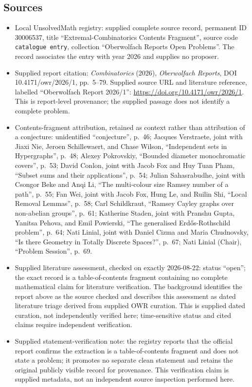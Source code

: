 \documentclass[11pt]{article}
\begin{document}
\subsection{Sources}
\begin{itemize}
\item Local UnsolvedMath registry: supplied complete source record, permanent ID 30006537, title ``Extremal-Combinatorics Contents Fragment'', source code \texttt{catalogue entry}, collection ``Oberwolfach Reports Open Problems''. The record associates the entry with year 2026 and supplies no proposer.
\item Supplied report citation: \textit{Combinatorics} (2026), \textit{Oberwolfach Reports}, DOI 10.4171/owr/2026/1, pp.~5--79. Supplied source URL and literature reference, labelled ``Oberwolfach Report 2026/1'': \url{https://doi.org/10.4171/owr/2026/1}. This is report-level provenance; the supplied passage does not identify a complete problem.
\item Contents-fragment attribution, retained as context rather than attribution of a conjecture: unidentified ``conjecture'', p.~46; Jacques Verstraete, joint with Jiaxi Nie, Jeroen Schillewaert, and Chase Wilson, ``Independent sets in Hypergraphs'', p.~48; Alexey Pokrovskiy, ``Bounded diameter monochromatic covers'', p.~53; David Conlon, joint with Jacob Fox and Huy Tuan Pham, ``Subset sums and their applications'', p.~54; Julian Sahasrabudhe, joint with Csongor Beke and Anqi Li, ``The multi-colour size Ramsey number of a path'', p.~55; Fan Wei, joint with Jacob Fox, Hung Le, and Ruilin Shi, ``Local Removal Lemmas'', p.~58; Carl Schildkraut, ``Ramsey Cayley graphs over non-abelian groups'', p.~61; Katherine Staden, joint with Pranshu Gupta, Yanitsa Pehova, and Emil Powierski, ``The generalised Erdős-Rothschild problem'', p.~64; Nati Linial, joint with Daniel Cizma and Maria Chudnovsky, ``Is there Geometry in Totally Discrete Spaces?'', p.~67; Nati Linial (Chair), ``Problem Session'', p.~69.
\item Supplied literature assessment, checked on exactly 2026-08-22: status ``open''; the exact record is a table-of-contents fragment containing no complete mathematical claim for literature verification. The background identifies the report above as the source checked and describes this assessment as dated literature triage derived from supplied OWR curation. This is supplied dated curation, not independently verified here; time-sensitive status and cited claims require independent verification.
\item Supplied statement-verification note: the registry reports that the official report confirms the extraction is a table-of-contents fragment and does not state a problem; it promotes no separate clean statement and retains the original publicly visible record for provenance. This verification claim is supplied metadata, not an independent source inspection performed here.
\end{itemize}
\end{document}
